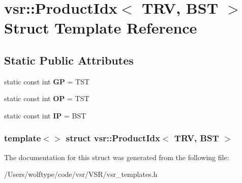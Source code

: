 \hypertarget{structvsr_1_1_product_idx_3_01_t_r_v_00_01_b_s_t_01_4}{\section{vsr\-:\-:Product\-Idx$<$ T\-R\-V, B\-S\-T $>$ Struct Template Reference}
\label{structvsr_1_1_product_idx_3_01_t_r_v_00_01_b_s_t_01_4}
}
\subsection*{Static Public Attributes}
\begin{DoxyCompactItemize}
\item 
\hypertarget{structvsr_1_1_product_idx_3_01_t_r_v_00_01_b_s_t_01_4_aa6dc021c80e922aa261488eb4f853fd8}{static const int {\bfseries G\-P} = T\-S\-T}\label{structvsr_1_1_product_idx_3_01_t_r_v_00_01_b_s_t_01_4_aa6dc021c80e922aa261488eb4f853fd8}

\item 
\hypertarget{structvsr_1_1_product_idx_3_01_t_r_v_00_01_b_s_t_01_4_ae4c855471786c3f58f6aad889e7d0682}{static const int {\bfseries O\-P} = T\-S\-T}\label{structvsr_1_1_product_idx_3_01_t_r_v_00_01_b_s_t_01_4_ae4c855471786c3f58f6aad889e7d0682}

\item 
\hypertarget{structvsr_1_1_product_idx_3_01_t_r_v_00_01_b_s_t_01_4_af62654012ad5cc9793f25ecf9b3c58e0}{static const int {\bfseries I\-P} = B\-S\-T}\label{structvsr_1_1_product_idx_3_01_t_r_v_00_01_b_s_t_01_4_af62654012ad5cc9793f25ecf9b3c58e0}

\end{DoxyCompactItemize}
\subsubsection*{template$<$$>$ struct vsr\-::\-Product\-Idx$<$ T\-R\-V, B\-S\-T $>$}



The documentation for this struct was generated from the following file\-:\begin{DoxyCompactItemize}
\item 
/\-Users/wolftype/code/vsr/\-V\-S\-R/vsr\-\_\-templates.\-h\end{DoxyCompactItemize}

